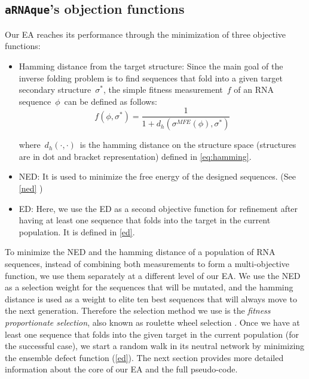 
\subsection{\texttt{aRNAque}'s objection functions}
\label{sec:objective_function}
Our \ac{EA} reaches its performance through the minimization of three objective functions:

\begin{itemize}
	\item
	Hamming distance from the target structure: Since the main goal of the inverse folding problem is to find sequences that fold into a given target secondary structure~\(\sigma^*\), the simple fitness measurement~\(f\) of an \ac{RNA} sequence~\(\phi\)~can be defined as follows:
	\begin{equation}
	\label{eq:fitness}
	f(\phi, \sigma^*) = \frac{1}{1 + d_h(\sigma^{MFE}(\phi) , \sigma^*)}
	\end{equation}
	
	where~\(d_h(\cdot,\cdot)\)~is the hamming distance on the structure space (structures are in dot and bracket representation) defined in \autoref{eq:hamming}.
	
	\item
	\ac{NED}: It is used to minimize the free energy of the designed sequences. (See \autoref{ned} )
	
	\item
	\ac{ED}: Here, we use the \ac{ED} as a second objective function for refinement after having at least one sequence that folds into the target in the current population. It is defined in \autoref{ed}.
\end{itemize}
To minimize the \ac{NED} and the hamming distance of a population of \ac{RNA} sequences, instead of combining both measurements to form a multi-objective function, we use them separately at a different level of our \ac{EA}. We use the \ac{NED} as a selection weight for the sequences that will be mutated, and the hamming distance is used as a weight to elite ten best sequences that will always move to the next generation. Therefore the selection method we use is the \textit{fitness proportionate selection}, also known as roulette wheel selection \cite{lipowski2012roulette}. Once we have at least one sequence that folds into the given target in the current population (for the successful case), we start a random walk in its neutral network by minimizing the ensemble defect function (\autoref{ed}). The next section provides more detailed information about the core of our \ac{EA} and the full pseudo-code. 

